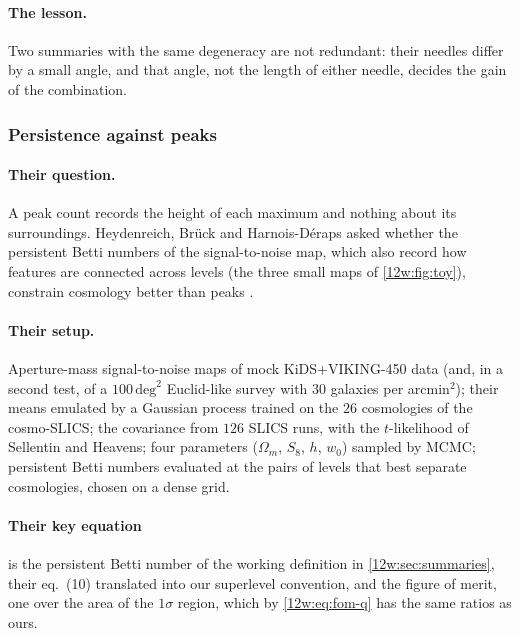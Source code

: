 \paragraph{The lesson.} Two summaries with the same degeneracy are not redundant: their needles differ by a small
angle, and that angle, not the length of either needle, decides the gain of the combination.

\subsubsection{Persistence against peaks}
\label{12w:sec:repro-heydenreich}

\paragraph{Their question.} A peak count records the height of each maximum and nothing about its surroundings.
Heydenreich, Br\"uck and Harnois-D\'eraps asked whether the persistent Betti numbers of the signal-to-noise map, which
also record how features are connected across levels (the three small maps of \cref{12w:fig:toy}), constrain
cosmology better than peaks \cite{Heydenreich2021}.

\paragraph{Their setup.} Aperture-mass signal-to-noise maps of mock KiDS+VIKING-450 data (and, in a second test, of a
$100\,\mathrm{deg}^2$ Euclid-like survey with $30$ galaxies per arcmin$^2$); their means emulated by a Gaussian process
trained on the $26$ cosmologies of the cosmo-SLICS; the covariance from $126$ SLICS runs, with the $t$-likelihood of
Sellentin and Heavens; four parameters ($\Omega_m$, $S_8$, $h$, $w_0$) sampled by MCMC; persistent Betti numbers
evaluated at the pairs of levels that best separate cosmologies, chosen on a dense grid.

\paragraph{Their key equation} is the persistent Betti number of the working definition in \cref{12w:sec:summaries},
their eq.~(10) translated into our superlevel convention, and the figure of merit, one over the area of the $1\sigma$
region, which by \eqref{12w:eq:fom-q} has the same ratios as ours.

